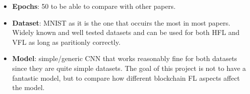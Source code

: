 
\begin{itemize}
    \item \textbf{Epochs}: 50 to be able to compare with other papers.
    
    \item \textbf{Dataset}: MNIST \cite{lecun2010mnist} as it is the one that occuirs the most in most papers. Widely known and well tested datasets and can be used for both HFL and VFL as long as paritionly correctly.
    
    \item \textbf{Model}: simple/generic CNN that works reasonably fine for both datasets since they are quite simple datasets. The goal of this project is not to have a fantastic model, but to compare how different blockchain FL aspects affect the model.
\end{itemize}
